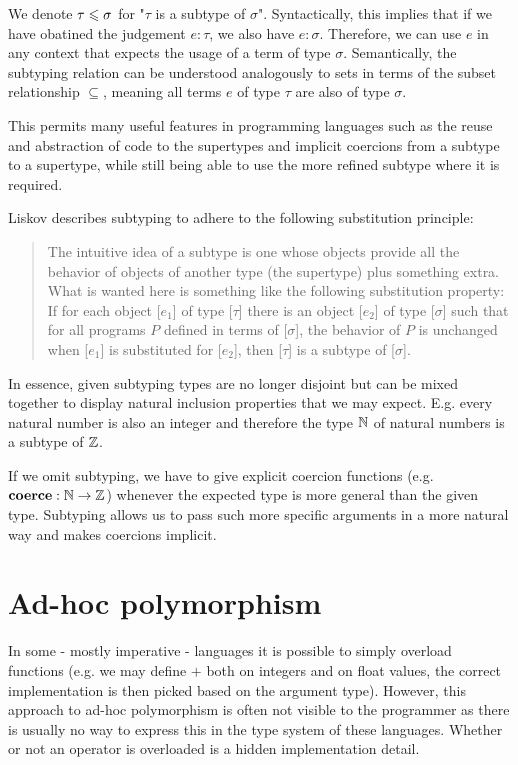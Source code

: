 We denote $\tau \leqslant \sigma$ for "$\tau$ is a subtype of $\sigma$".
Syntactically, this implies that if we have obatined the judgement $e : \tau$, we also have $e : \sigma$.
Therefore, we can use $e$ in any context that expects the usage of a term of type $\sigma$.
Semantically, the subtyping relation can be understood analogously to sets in terms of the subset relationship $\subseteq$,
meaning all terms $e$ of type $\tau$ are also of type $\sigma$.
\cite{reynolds_1998}

This permits many useful features in programming languages such as the reuse and abstraction of code to the supertypes and implicit coercions from a subtype to a supertype, while still being able to use the more refined subtype where it is required.

Liskov \cite{liskov} describes subtyping to adhere to the following substitution principle:

\begin{quote}
  The intuitive idea of a subtype is one whose objects provide all the behavior of objects of another type (the supertype) plus something extra.
  What is wanted here is something like the following substitution property:
  If for each object [$e_1$] of type [$\tau$] there is an object [$e_2$] of type [$\sigma$] such that for all programs $P$ defined in terms of [$\sigma$],
  the behavior of $P$ is unchanged when [$e_1$] is substituted for [$e_2$], then [$\tau$] is a subtype of [$\sigma$].
\end{quote}

In essence, given subtyping types are no longer disjoint but can be mixed together to display natural inclusion properties that we may expect.
E.g. every natural number is also an integer and therefore the type $\mathbb{N}$ of natural numbers is a subtype of $\mathbb{Z}$.

If we omit subtyping, we have to give explicit coercion functions (e.g. $\mathbf{coerce} : \mathbb{N} \to \mathbb{Z}$) whenever the expected type is more general than the given type.
Subtyping allows us to pass such more specific arguments in a more natural way and makes coercions implicit.

\section{Ad-hoc polymorphism}
\label{sec:ad-hoc-polymorphism}

In some - mostly imperative - languages it is possible to simply overload functions (e.g. we may define $+$ both on integers and on float values, the correct implementation is then picked based on the argument type).
However, this approach to ad-hoc polymorphism is often not visible to the programmer as there is usually no way to express this in the type system of these languages.
Whether or not an operator is overloaded is a hidden implementation detail. %


